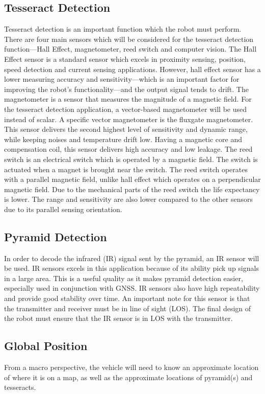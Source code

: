 \documentclass[12pt]{article}
\begin{document}
\subsection{Tesseract Detection}
Tesseract detection is an important function which the robot must perform. There are four main sensors which will be considered for the tesseract detection function—Hall Effect, magnetometer, reed switch and computer vision. 
The Hall Effect sensor is a standard sensor which excels in proximity sensing, position, speed detection and current sensing applications. However, hall effect sensor has a lower measuring accuracy and sensitivity—which is an important factor for improving the robot’s functionality—and the output signal tends to drift. 
The magnetometer is a sensor that measures the magnitude of a magnetic field.  For the tesseract detection application, a vector-based magnetometer will be used instead of scalar. A specific vector magnetometer is the fluxgate magnetometer. This sensor delivers the second highest level of sensitivity and dynamic range, while keeping noises and temperature drift low. Having a magnetic core and compensation coil, this sensor delivers high accuracy and low leakage.  
The reed switch is an electrical switch which is operated by a magnetic field. The switch is actuated when a magnet is brought near the switch. The reed switch operates with a parallel magnetic field, unlike hall effect which operates on a perpendicular magnetic field. Due to the mechanical parts of the reed switch the life expectancy is lower. The range and sensitivity are also lower compared to the other sensors due to its parallel sensing orientation. 


\subsection{Pyramid Detection}
In order to decode the infrared (IR) signal sent by the pyramid, an IR sensor will be used.  IR sensors excels in this application because of its ability pick up signals in a large area. This is a useful quality as it makes pyramid detection easier, especially used in conjunction with  GNSS. IR sensors also have high repeatability and provide good stability over time. An important note for this sensor is that the transmitter and receiver must be in line of sight (LOS). The final design of the robot must ensure that the IR sensor is in LOS with the transmitter.

\subsection{Global Position}
From a macro perspective, the vehicle will need to know an approximate location of where it is on a map, as well as the approximate locations of pyramid(s) and tesseracts. \\
\end{document}
